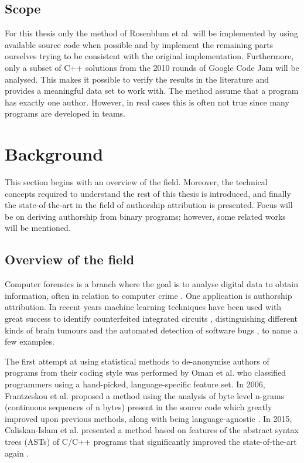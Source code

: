 \documentclass[a4paper,11pt]{kth-mag}
\begin{document}
\section{Scope}
For this thesis only the method of Rosenblum et al. will be implemented by using
available source code when possible and by implement the remaining parts ourselves
trying to be consistent with the original implementation. Furthermore, only a subset of C++ solutions from the 2010 rounds of Google
Code Jam will be analysed. This makes it possible to verify the results in the literature
\parencite{rosenblum2011wrote} and provides a meaningful data set to work with.
The method assume that a program has exactly one author. However, in real cases this is
often not true since many programs are developed in teams.

\chapter{Background}
This section begins with an overview of the field. Moreover, the
technical concepts required to understand the rest of this thesis is introduced, and finally
the state-of-the-art in the field of authorship attribution is presented. Focus will
be on deriving authorship from binary programs; however, some related works
will be mentioned.

\section{Overview of the field}
Computer forensics is a branch where the goal is to analyse digital data to
obtain information, often in relation to computer crime
\parencite{reith2002examination}. One application is authorship attribution. In
recent years machine learning techniques have been used with great success to
identify counterfeited integrated circuits \parencite{huang2013counterfeit},
distinguishing different kinds of brain tumours
\parencite{zacharaki2009classification} and the automated detection of software
bugs \parencite{aleem2015comparative}, to name a few examples.

The first attempt at using statistical methods to de-anonymise authors of
programs from their coding style was performed by Oman et al.
\parencite{oman1989programming} who classified programmers using a hand-picked,
language-specific feature set. In 2006, Frantzeskou et al. proposed a method
using the analysis of byte level n-grams (continuous sequences of n bytes)
present in the source code which greatly improved upon previous methods, along
with being language-agnostic \parencite{frantzeskou2006source}. In 2015,
Caliskan-Islam et al. presented a method based on features of the abstract
syntax trees (ASTs) of C/C++ programs that significantly improved the
state-of-the-art again \parencite{caliskan2015anonymizing}.
 
\end{document}
